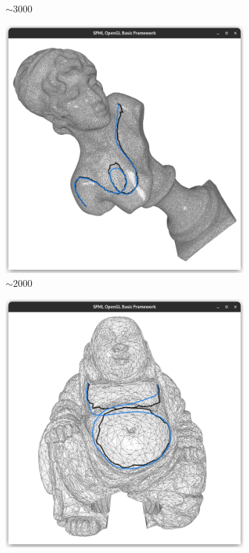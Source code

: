 \documentclass{stdlocal}
\begin{document}
\begin{figure}
\begin{subfigure}[b]{0.24\linewidth}
    \caption{$\sim 3000$}
  \end{subfigure}
  \begin{subfigure}[b]{0.24\linewidth}
    \centering
    \includegraphics[width=\linewidth,trim={15px 20 15 50},clip]{images/sappho-smooth-0.95.png}
    \caption{$\sim 2000$}
  \end{subfigure}
  \begin{subfigure}[b]{0.24\linewidth}
    \centering
    \includegraphics[width=\linewidth,trim={15px 20 15 50},clip]{images/buddha-smooth-0.95.png}

\end{subfigure}
\end{figure}
\end{document}
